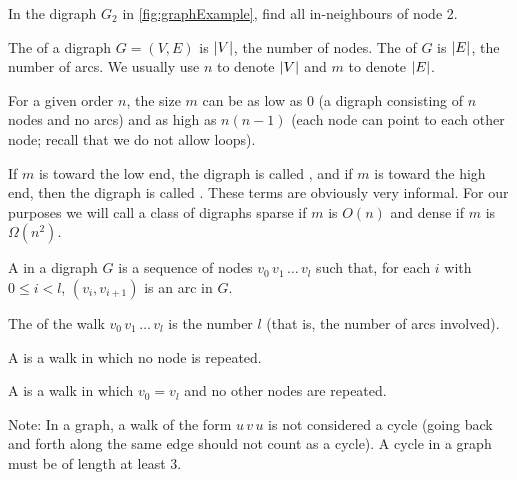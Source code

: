 \begin{Boxample}[2]
In the digraph $G_2$ in \cref{fig:graphExample}, find all in-neighbours of node 2.
\end{Boxample}


%


\begin{Definition} 
The  of a digraph $G = (V, E)$ is $\lvert V\rvert$, the number of nodes. 
The  of $G$ is $\lvert E\rvert$, the number of arcs. 
We usually use $n$ to denote $\lvert V\rvert$ and $m$ to denote $\lvert E\rvert$.
\end{Definition}
 

For a given order $n$, the size $m$ can be as low as $0$ (a digraph consisting of $n$ nodes and no arcs)  
and as high as $n(n-1)$ (each node can point to each other node; recall that we do not allow loops).

\begin{Definition}  
If $m$ is toward the low end, the digraph is called , 
and if $m$ is toward the high end, then the digraph is called . 
These terms are obviously very informal. 
For our purposes we will call a class of digraphs sparse if $m$ is $O(n)$ and dense if $m$ is $\Omega(n^2)$.
\end{Definition}


\begin{Definition} 
A  in a digraph $G$ is a sequence of nodes $v_0\, v_1\, \ldots\, v_l$ 
such that, for each $i$ with $0 \leq i < l$, $(v_i, v_{i+1})$ is an arc in $G$. 

The  of the walk $v_0\, v_1\, \ldots \,v_l$ is the number $l$ (that is, the number of arcs involved).

A  is a walk in which no node is repeated. 

A  is a walk in which $v_0 = v_l$ and no other nodes
are repeated.
\end{Definition}

Note: In a graph, a walk of the form $u\, v\, u$ is not considered a cycle 
(going back and forth along the same edge should not count as a cycle). 
A cycle in a graph must be of length at least $3$.


